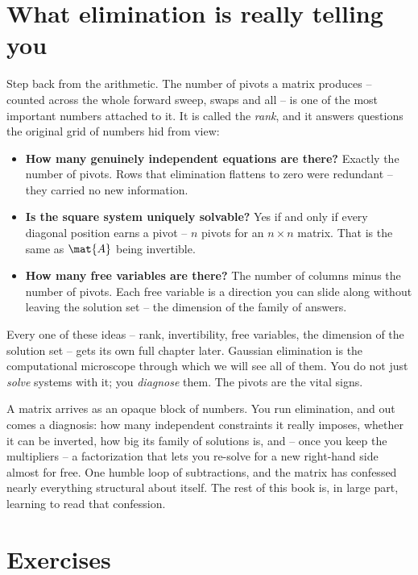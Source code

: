 \section{What elimination is really telling you}

Step back from the arithmetic. The number of pivots a matrix produces -- counted
across the whole forward sweep, swaps and all -- is one of the most important
numbers attached to it. It is called the \emph{rank}, and it answers questions
the original grid of numbers hid from view:

\begin{itemize}
  \item \textbf{How many genuinely independent equations are there?} Exactly the
  number of pivots. Rows that elimination flattens to zero were redundant -- they
  carried no new information.
  \item \textbf{Is the square system uniquely solvable?} Yes if and only if
  every diagonal position earns a pivot -- $n$ pivots for an $n\times n$ matrix.
  That is the same as $\mat{A}$ being invertible.
  \item \textbf{How many free variables are there?} The number of columns minus
  the number of pivots. Each free variable is a direction you can slide along
  without leaving the solution set -- the dimension of the family of answers.
\end{itemize}

Every one of these ideas -- rank, invertibility, free variables, the dimension of
the solution set -- gets its own full chapter later. Gaussian elimination is the
computational microscope through which we will see all of them. You do not just
\emph{solve} systems with it; you \emph{diagnose} them. The pivots are the vital
signs.

\begin{aestheticbox}
A matrix arrives as an opaque block of numbers. You run elimination, and out
comes a diagnosis: how many independent constraints it really imposes, whether it
can be inverted, how big its family of solutions is, and -- once you keep the
multipliers -- a factorization that lets you re-solve for a new right-hand side
almost for free. One humble loop of subtractions, and the matrix has confessed
nearly everything structural about itself. The rest of this book is, in large
part, learning to read that confession.
\end{aestheticbox}

\section{Exercises}


